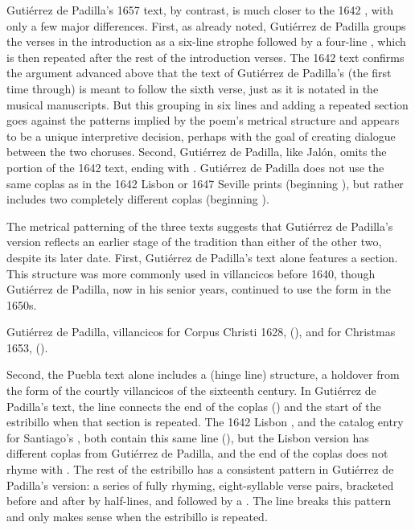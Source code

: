 Gutiérrez de Padilla's 1657 text, by contrast, is much closer to the 1642
, with only a few major differences.
First, as already noted, Gutiérrez de Padilla groups the verses in the
introduction as a six-line strophe followed by a four-line ,
which is then repeated after the rest of the introduction verses.
The 1642 text confirms the argument advanced above that the text of Gutiérrez de
Padilla's  (the first time through) is meant to follow the sixth
verse, just as it is notated in the musical manuscripts.
But this grouping in six lines and adding a repeated section goes against the
patterns implied by the poem's metrical structure and appears to be a unique
interpretive decision, perhaps with the goal of creating dialogue between the
two choruses.
Second, Gutiérrez de Padilla, like Jalón, omits the  portion of the
1642 text, ending with .
Gutiérrez de Padilla does not use the same coplas as in the 1642 Lisbon or 1647
Seville prints (beginning ), but rather includes
two completely different coplas (beginning ).

The metrical patterning of the three texts suggests that Gutiérrez de Padilla's
version reflects an earlier stage of the tradition than either of the other
two, despite its later date.
First, Gutiérrez de Padilla's text alone features a  section.
This structure was more commonly used in villancicos before 1640, though
Gutiérrez de Padilla, now in his senior years, continued to use the form in the
1650s.%
\begin{Footnote}
    Gutiérrez de Padilla, villancicos for Corpus Christi 1628,  (), and for Christmas 1653,  ().
\end{Footnote}
Second, the Puebla text alone includes a  (hinge line)
structure, a holdover from the form of the courtly villancicos of the sixteenth
century.%
    \Autocite[\XXX]{Navarro:Metrica}
In Gutiérrez de Padilla's text, the line 
connects the end of the coplas () and
the start of the estribillo when that section is repeated.
The 1642 Lisbon , and the catalog entry for Santiago's
, both contain this same line (),
but the Lisbon version has different coplas from Gutiérrez de Padilla, and the
end of the coplas does not rhyme with .
The rest of the estribillo has a consistent pattern in Gutiérrez de Padilla's
version: a series of fully rhyming, eight-syllable verse pairs, bracketed
before and after by half-lines, and followed by a .
The line  breaks this pattern and only makes sense when
the estribillo is repeated. 

